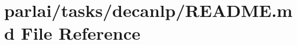 \hypertarget{parlai_2tasks_2decanlp_2README_8md}{}\section{parlai/tasks/decanlp/\+R\+E\+A\+D\+ME.md File Reference}
\label{parlai_2tasks_2decanlp_2README_8md}
